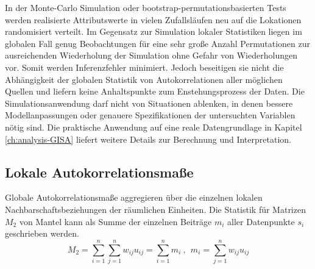 In der Monte-Carlo Simulation oder bootstrap-permutationsbasierten Tests werden realisierte Attributswerte in vielen Zufallsläufen neu auf die Lokationen randomisiert verteilt. 
Im Gegensatz zur Simulation lokaler Statistiken liegen im globalen Fall genug Beobachtungen für eine sehr große Anzahl Permutationen 
zur ausreichenden Wiederholung der Simulation ohne Gefahr von Wiederholungen vor. Somit werden Inferenzfehler minimiert. 
Jedoch beseitigen sie nicht die Abhängigkeit der globalen Statistik von Autokorrelationen aller möglichen Quellen 
und liefern keine Anhaltspunkte zum Enstehungsprozess der Daten. 
Die Simulationsanwendung darf nicht von Situationen ablenken, in denen bessere Modellanpassungen 
oder genauere Spezifikationen der untersuchten Variablen nötig sind. \cite[p. 278]{bivand_applied_2013}
Die praktische Anwendung auf eine reale Datengrundlage in Kapitel \ref{ch:analysis-GISA} liefert weitere Details zur Berechnung und Interpretation.





\subsection{Lokale Autokorrelationsmaße}
\label{ch:autocorrelation-LISA}

Globale Autokorrelationsmaße aggregieren über die einzelnen lokalen Nachbarschaftsbeziehungen der räumlichen Einheiten. 
Die Statistik für Matrizen $M_2$ von Mantel kann als Summe der einzelnen Beiträge $m_i$ aller Datenpunkte $s_i$ geschrieben werden.
\begin{equation}
    M_2 = \sum_{i=1}^{n}\sum_{j=1}^{n}{w_{ij} u_{ij}} = \sum_{i=1}^{n} m_i ~ , ~ ~ m_i = \sum_{j=1}^{n} {w_{ij} u_{ij}}
\end{equation}

